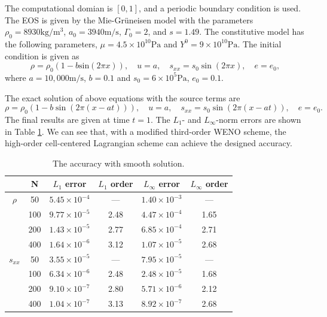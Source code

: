 \documentclass[review]{elsarticle}
\begin{document}
The computational domian is $[0,1]$, and a periodic boundary condition is used. The EOS is given by the Mie-Gr\"uneisen model with the parameters $\rho_0 = 8930 \text{kg}/\text{m}^3$, $a_0 = 3940 \text{m}/\text{s}$, $\Gamma_0 =2$, and $s=1.49$. The constitutive model has the following parameters, $\mu = 4.5\times 10^{10} \text{Pa}$ and $Y^0 = 9\times 10^{10} \text{Pa}$.  The initial condition  is  given as
\begin{equation}
  \rho = \rho_0(1-b \text{sin}(2\pi x)), \quad u = a, \quad  s_{xx} = s_0 \sin(2\pi x), \quad e=e_0,
\end{equation}
where $a = 10,000\text{m}/\text{s}$, $ b = 0.1$  and  $s_0 = 6\times 10^5 \text{Pa}$, $e_0 = 0.1$.


The exact solution of above equations with the source terms are 
\begin{equation}
  \rho = \rho_0(1-b\sin(2\pi(x-at))),\quad u=a,\quad s_{xx}=s_0\sin(2\pi(x-at)),\quad e=e_0.
\end{equation}
The final results are given at time $t = 1$. The  $L_1 $- and $ L_\infty$-norm  errors  are shown in Table \ref{tab:1}. We can see that,  with a  modified third-order WENO scheme, the high-order cell-centered Lagrangian scheme can  achieve the designed  accuracy.

\begin{table}[htbp]
  \small
  \centering
\setlength{\belowcaptionskip}{10pt}
\caption{\small The accuracy with smooth solution.}
  \begin{tabular}{cccccc}
\hline
            & N       & $L_1$ error  & $L_1$ order & $L_{\infty}$ error & $L_{\infty}$ order \\
\hline
    $ \rho $      &50           &  $5.45\times 10^{-4}$     &---         &  $1.40\times 10^{-3}$         & ---  \\
                  &100          &  $9.77\times 10^{-5}$     &2.48        &  $4.47\times 10^{-4}$         & 1.65 \\
                  &200          &  $1.43\times 10^{-5}$     &2.77        &  $6.85\times 10^{-4}$         & 2.71 \\
                  &400          &  $1.64\times 10^{-6}$     &3.12        &  $1.07\times 10^{-5}$         & 2.68 \\
\hline
    $s_{xx}$     &50           &  $3.55\times 10^{-5}$     &---         &  $7.95\times 10^{-5}$         & ---  \\
                  &100          &  $6.34\times 10^{-6}$     &2.48        &  $2.48\times 10^{-5}$         & 1.68 \\
                  &200          &  $9.10\times 10^{-7}$     &2.80        &  $5.71\times 10^{-6}$         & 2.12 \\
                  &400          &  $1.04\times 10^{-7}$     &3.13        &  $8.92\times 10^{-7}$         & 2.68 \\
\hline
    \end{tabular}
\label{tab:1}
\end{table}
\end{document}

